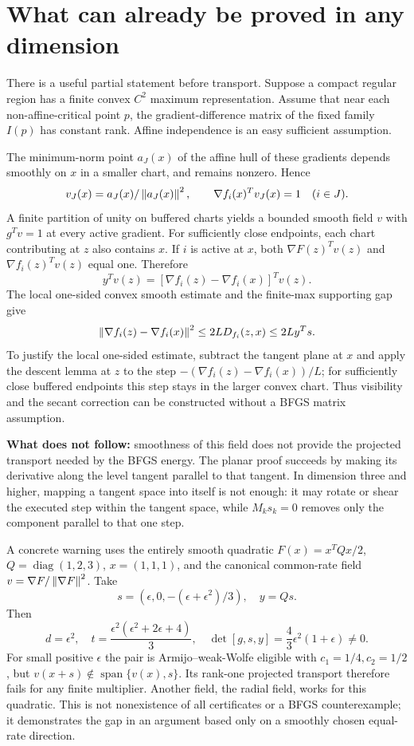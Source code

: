 \documentclass[10pt,oneside,openany]{book}
\theoremstyle{remark}\newtheorem{remark}{Remark}[chapter]
\begin{document}
\setcounter{section}{8}
\setcounter{theorem}{7}
\setcounter{equation}{17}
\section{What can already be proved in any dimension}
There is a useful partial statement before transport. Suppose a compact regular region has a finite convex $C^2$ maximum representation. Assume that near each non-affine-critical point $p$, the gradient-difference matrix of the fixed family $I(p)$ has constant rank. Affine independence is an easy sufficient assumption.

The minimum-norm point $a_J(x)$ of the affine hull of these gradients depends smoothly on $x$ in a smaller chart, and remains nonzero. Hence
\[
 v_J(x)=a_J(x)/\left\lVert a_J(x)\right\rVert^2,
 \qquad \nabla f_i(x)^Tv_J(x)=1\quad(i\in J).
\]
A finite partition of unity on buffered charts yields a bounded smooth field $v$ with $g^Tv=1$ at every active gradient. For sufficiently close endpoints, each chart contributing at $z$ also contains $x$. If $i$ is active at $x$, both $\nabla F(z)^Tv(z)$ and $\nabla f_i(z)^Tv(z)$ equal one. Therefore
\[
 y^Tv(z)=[\nabla f_i(z)-\nabla f_i(x)]^Tv(z).
\]
The local one-sided convex smooth estimate and the finite-max supporting gap give
\[
 \left\lVert\nabla f_i(z)-\nabla f_i(x)\right\rVert^2
 \le2L D_{f_i}(z,x)\le2L y^Ts.
\]
To justify the local one-sided estimate, subtract the tangent plane at $x$ and apply the descent lemma at $z$ to the step $-(\nabla f_i(z)-\nabla f_i(x))/L$; for sufficiently close buffered endpoints this step stays in the larger convex chart. Thus visibility and the secant correction can be constructed without a BFGS matrix assumption.

\textbf{What does not follow:} smoothness of this field does not provide the projected transport needed by the BFGS energy. The planar proof succeeds by making its derivative along the level tangent parallel to that tangent. In dimension three and higher, mapping a tangent space into itself is not enough: it may rotate or shear the executed step within the tangent space, while $M_ks_k=0$ removes only the component parallel to that one step.

A concrete warning uses the entirely smooth quadratic $F(x)=x^TQx/2$, $Q=\operatorname{diag}(1,2,3)$, $x=(1,1,1)$, and the canonical common-rate field $v=\nabla F/\left\lVert\nabla F\right\rVert^2$. Take
\[
 s=(\epsilon,0,-(\epsilon+\epsilon^2)/3),\quad y=Qs.
\]
Then
\[
 d=\epsilon^2,\quad t=\frac{\epsilon^2(\epsilon^2+2\epsilon+4)}3,\quad
 \det[g,s,y]=\frac43\epsilon^2(1+\epsilon)\ne0.
\]
For small positive $\epsilon$ the pair is Armijo--weak-Wolfe eligible with $c_1=1/4,c_2=1/2$, but $v(x+s)\notin\operatorname{span}\{v(x),s\}$. Its rank-one projected transport therefore fails for any finite multiplier. Another field, the radial field, works for this quadratic. This is not nonexistence of all certificates or a BFGS counterexample; it demonstrates the gap in an argument based only on a smoothly chosen equal-rate direction.
\end{document}
